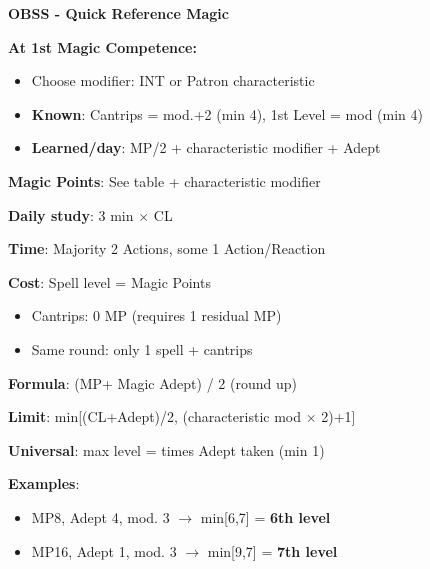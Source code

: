 \documentclass[10pt,a4paper,landscape]{article}
\begin{document}
	
	\begin{center}
		{\Huge\textbf{OBSS - Quick Reference Magic}}
	\end{center}
	
	\begin{multicols}{3}
		
		
		\begin{tcolorbox}[title=INITIAL SETUP]
			\textbf{At 1st Magic Competence:}
			\begin{itemize}[leftmargin=*,noitemsep]
				\item Choose modifier: INT or Patron characteristic
				\item \textbf{Known}: Cantrips = mod.+2 (min 4), 1st Level = mod (min 4)
				\item \textbf{Learned/day}:  MP/2 + characteristic modifier + Adept
			\end{itemize}
			
			\textbf{Magic Points}: See table + characteristic modifier
			
			\textbf{Daily study}: 3 min $\times$ CL
		\end{tcolorbox}
		
		\begin{tcolorbox}[title=CASTING SPELLS]
			\textbf{Time}: Majority 2 Actions, some 1 Action/Reaction
			
			\textbf{Cost}: Spell level = Magic Points
			\begin{itemize}[leftmargin=*,noitemsep]
				\item Cantrips: 0 MP (requires 1 residual MP)
				\item Same round: only 1 spell + cantrips
			\end{itemize}
			
		\end{tcolorbox}
		
		\begin{tcolorbox}[title=MAXIMUM SPELL LEVEL]
			\textbf{Formula}: (MP+ Magic Adept) / 2 (round up)
			
			\textbf{Limit}: min[(CL+Adept)/2, (characteristic mod $\times$ 2)+1]
			
			\textbf{Universal}: max level = times Adept taken (min 1)
			
			\textbf{Examples}:
			\begin{itemize}[leftmargin=*,noitemsep]
				\item MP8, Adept 4, mod. 3 $\rightarrow$ min[6,7] = \textbf{6th level}
				\item MP16, Adept 1, mod. 3 $\rightarrow$ min[9,7] = \textbf{7th level}
			\end{itemize}
		\end{tcolorbox}
		

\end{multicols}
\end{document}
